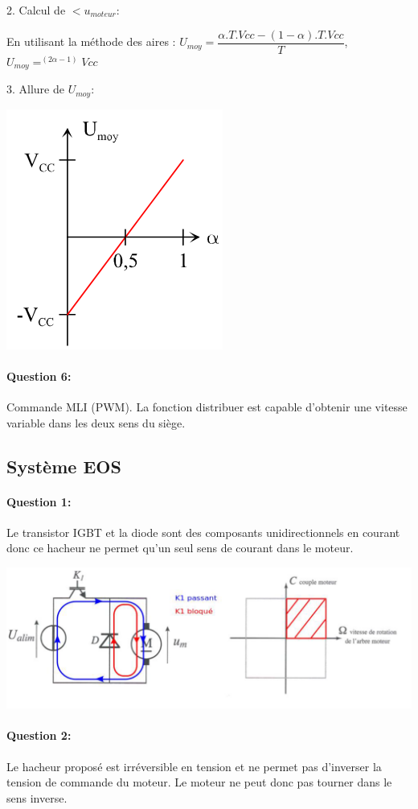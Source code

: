2. Calcul de $<u_{moteur}$:

En utilisant la méthode des aires : $U_{moy}=\dfrac{\alpha.T.Vcc-(1-\alpha).T.Vcc}{T}$, $U_{moy}=^(2\alpha-1)Vcc$

3. Allure de $U_{moy}$:

\begin{center}
 \includegraphics[width=0.3\linewidth]{img/img05}
\end{center}

\paragraph{Question 6:} 
Commande MLI (PWM). La fonction \og distribuer \fg est capable d'obtenir une vitesse variable dans les deux sens du siège.

\subsection{Système EOS}

\paragraph{Question 1:}

Le transistor IGBT et la diode sont des composants unidirectionnels en courant donc ce hacheur ne permet qu'un seul sens de courant dans le moteur.

\begin{center}
 \includegraphics[width=0.3\linewidth]{img/td02_14}
\end{center}

\paragraph{Question 2:}

Le hacheur proposé est irréversible en tension et ne permet pas d'inverser la tension de
commande du moteur. Le moteur ne peut donc pas tourner dans le sens inverse.

